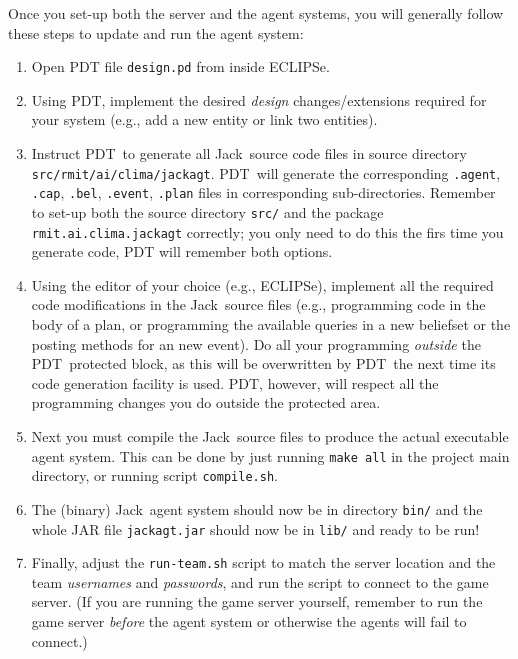 \documentclass[10pt]{article}
\newcommand{\propername}[1]{\mbox{\sf #1}\xspace}
\newcommand{\JACK}{\propername{Jack}}
\newcommand{\PDT}{\propername{PDT}}
\newcommand{\ECLIPSE}{\propername{ECLIPSe}}
\begin{document}
Once you set-up both the server and the agent systems, you will generally follow these steps to update and run the agent system:
%
\begin{enumerate}\addtolength{\itemsep}{-.02in}
\item Open \PDT  file \texttt{design.pd} from inside \ECLIPSE.

\item Using \PDT, implement the desired \textit{design} changes/extensions required for your system (e.g., add a new entity or link two entities).

\item Instruct \PDT\ to generate all \JACK\ source code files in source directory \texttt{src/rmit/ai/clima/jackagt}. \PDT\ will
generate the corresponding \texttt{.agent}, \texttt{.cap}, \texttt{.bel}, \texttt{.event}, \texttt{.plan} files in corresponding sub-directories. Remember to set-up both the source directory \texttt{src/} and the package \texttt{rmit.ai.clima.jackagt} correctly; you only need to do this the firs time you generate code, \PDT will remember both options.

\item Using the editor of your choice (e.g., \ECLIPSE), implement all  the required code modifications in the \JACK\ source files (e.g., programming code in the body of a plan, or programming the available queries in a new beliefset or the posting methods for an new event). Do all your programming \textit{outside} the \PDT\ protected block, as this will be overwritten by
\PDT\ the next time its code generation facility is used. \PDT, however, will respect all the programming changes you do outside the protected area.


\item Next you must compile the \JACK\ source files to produce the actual executable agent system. This can be done by just running \texttt{make all} in the project main directory, or running script \texttt{compile.sh}. 


\item The (binary) \JACK\ agent system should now be in directory \texttt{bin/} and the whole JAR file \texttt{jackagt.jar} should now be in \texttt{lib/} and ready to be run!

\item Finally, adjust the \texttt{run-team.sh} script to match the server location and the team \textit{usernames} and \textit{passwords}, and run the script to connect to the game server. (If you are running the game server yourself, remember to run the game server \textit{before} the agent system or otherwise the agents will fail to connect.)
\end{enumerate}
\end{document}

